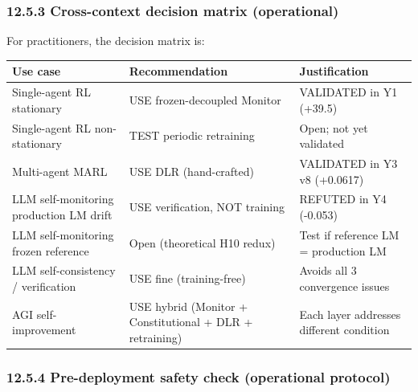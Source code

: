 \documentclass[
]{article}
\newcounter{none} %
\begin{document}
\subsubsection{12.5.3 Cross-context decision matrix
(operational)}\label{cross-context-decision-matrix-operational}

For practitioners, the decision matrix is:

{\def\LTcaptype{none} %
\begin{longtable}[]{@{}
  >{\raggedright\arraybackslash}p{}
  >{\raggedright\arraybackslash}p{}
  >{\raggedright\arraybackslash}p{}@{}}
\toprule\noalign{}
\begin{minipage}[b]{\linewidth}\raggedright
Use case
\end{minipage} & \begin{minipage}[b]{\linewidth}\raggedright
Recommendation
\end{minipage} & \begin{minipage}[b]{\linewidth}\raggedright
Justification
\end{minipage} \\
\midrule\noalign{}
\endhead
\bottomrule\noalign{}
\endlastfoot
Single-agent RL stationary & USE frozen-decoupled Monitor & VALIDATED in
Y1 (+39.5) \\
Single-agent RL non-stationary & TEST periodic retraining & Open; not
yet validated \\
Multi-agent MARL & USE DLR (hand-crafted) & VALIDATED in Y3 v8
(+0.0617) \\
LLM self-monitoring production LM drift & USE verification, NOT training
& REFUTED in Y4 (-0.053) \\
LLM self-monitoring frozen reference & Open (theoretical H10 redux) &
Test if reference LM = production LM \\
LLM self-consistency / verification & USE fine (training-free) & Avoids
all 3 convergence issues \\
AGI self-improvement & USE hybrid (Monitor + Constitutional + DLR +
retraining) & Each layer addresses different condition \\
\end{longtable}
}

\subsubsection{12.5.4 Pre-deployment safety check (operational
protocol)}\label{pre-deployment-safety-check-operational-protocol}
\end{document}
